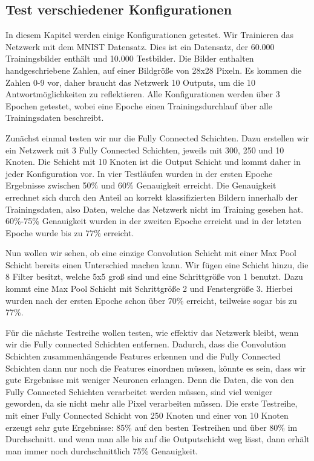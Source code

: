 \documentclass[12pt]{article}
\begin{document}
\subsection{Test verschiedener Konfigurationen}
In diesem Kapitel werden einige Konfigurationen getestet. Wir Trainieren das Netzwerk mit dem MNIST Datensatz. Dies ist ein Datensatz, der 60.000 Trainingsbilder enthält und 10.000 Testbilder. Die Bilder enthalten handgeschriebene Zahlen, auf einer Bildgröße von 28x28 Pixeln. Es kommen die Zahlen 0-9 vor, daher braucht das Netzwerk 10 Outputs, um die 10 Antwortmöglichkeiten zu reflektieren. Alle Konfigurationen werden über 3 Epochen getestet, wobei eine Epoche einen Trainingsdurchlauf über alle Trainingsdaten beschreibt.

Zunächst einmal testen wir nur die Fully Connected Schichten. Dazu erstellen wir ein Netzwerk mit 3 Fully Connected Schichten, jeweils mit 300, 250 und 10 Knoten.
Die Schicht mit 10 Knoten ist die Output Schicht und kommt daher in jeder Konfiguration vor. 
In vier Testläufen wurden in der ersten Epoche Ergebnisse zwischen 50\% und 60\% Genauigkeit erreicht. Die Genauigkeit errechnet sich durch den Anteil an korrekt klassifizierten Bildern innerhalb der Trainingsdaten, also Daten, welche das Netzwerk nicht im Training gesehen hat. 60\%-75\% Genauigkeit wurden in der zweiten Epoche erreicht und in der letzten Epoche wurde bis zu 77\% erreicht.

Nun wollen wir sehen, ob eine einzige Convolution Schicht mit einer Max Pool Schicht bereits einen Unterschied machen kann. Wir fügen eine Schicht hinzu, die 8 Filter besitzt, welche 5x5 groß sind und eine Schrittgröße von 1 benutzt. Dazu kommt eine Max Pool Schicht mit Schrittgröße 2 und Fenstergröße 3.
Hierbei wurden nach der ersten Epoche schon über 70\% erreicht, teilweise sogar bis zu 77\%. 

Für die nächste Testreihe wollen testen, wie effektiv das Netzwerk bleibt, wenn wir die Fully connected Schichten entfernen. Dadurch, dass die Convolution Schichten zusammenhängende Features erkennen und die Fully Connected Schichten dann nur noch die Features einordnen müssen, könnte es sein, dass wir gute Ergebnisse mit weniger Neuronen erlangen. Denn die Daten, die von den Fully Connected Schichten verarbeitet werden müssen, sind viel weniger geworden, da sie nicht mehr alle Pixel verarbeiten müssen.
Die erste Testreihe, mit einer Fully Connected Schicht von 250 Knoten und einer von 10 Knoten erzeugt sehr gute Ergebnisse: 85\% auf den besten Testreihen und über 80\% im Durchschnitt.
und wenn man alle bis auf die Outputschicht weg lässt, dann erhält man immer noch durchschnittlich 75\% Genauigkeit.
\end{document}
